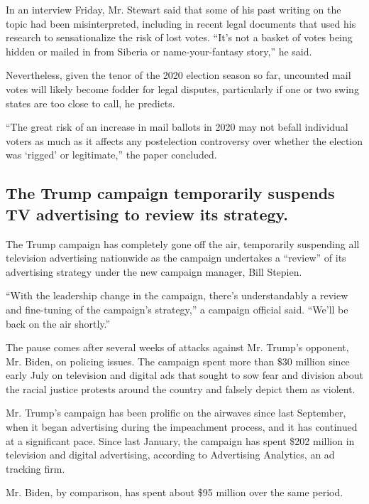 In an interview Friday, Mr. Stewart said that some of his past writing
on the topic had been misinterpreted, including in recent legal
documents that used his research to sensationalize the risk of lost
votes. ``It's not a basket of votes being hidden or mailed in from
Siberia or name-your-fantasy story,'' he said.

Nevertheless, given the tenor of the 2020 election season so far,
uncounted mail votes will likely become fodder for legal disputes,
particularly if one or two swing states are too close to call, he
predicts.

``The great risk of an increase in mail ballots in 2020 may not befall
individual voters as much as it affects any postelection controversy
over whether the election was `rigged' or legitimate,'' the paper
concluded.

\hypertarget{the-trump-campaign-temporarily-suspends-tv-advertising-to-review-its-strategy}{%
\subsection{The Trump campaign temporarily suspends TV advertising to
review its
strategy.}\label{the-trump-campaign-temporarily-suspends-tv-advertising-to-review-its-strategy}}

The Trump campaign has completely gone off the air, temporarily
suspending all television advertising nationwide as the campaign
undertakes a ``review'' of its advertising strategy under the new
campaign manager, Bill Stepien.

``With the leadership change in the campaign, there's understandably a
review and fine-tuning of the campaign's strategy,'' a campaign official
said. ``We'll be back on the air shortly.''

The pause comes after several weeks of attacks against Mr. Trump's
opponent, Mr. Biden, on policing issues. The campaign spent more than
\$30 million since early July on television and digital ads that sought
to sow fear and division about the racial justice protests around the
country and falsely depict them as violent.

Mr. Trump's campaign has been prolific on the airwaves since last
September, when it began advertising during the impeachment process, and
it has continued at a significant pace. Since last January, the campaign
has spent \$202 million in television and digital advertising, according
to Advertising Analytics, an ad tracking firm.

Mr. Biden, by comparison, has spent about \$95 million over the same
period.

